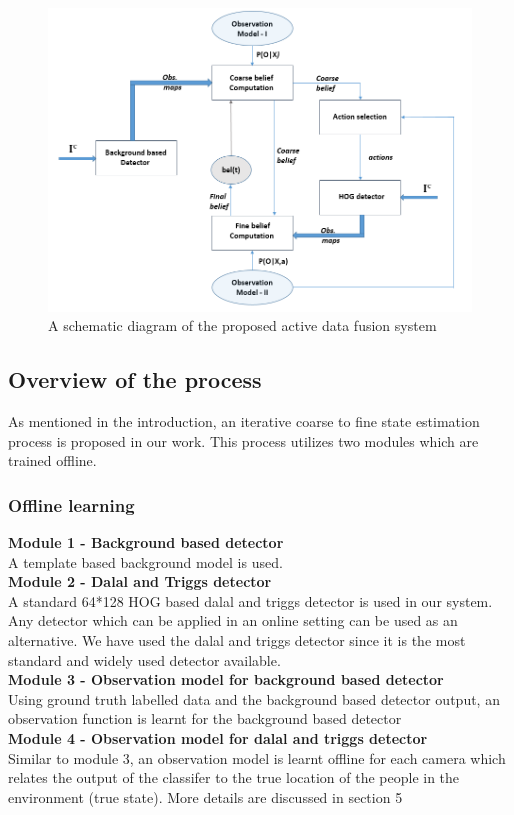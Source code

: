 \documentclass[10pt,twocolumn,letterpaper]{article}
\begin{document}
\begin{figure}
\begin{center}
\includegraphics[width=12cm]{img/block_dia_cir.PNG}
\end{center}
   \caption{A schematic diagram of the proposed active data fusion system}
\label{fig:Block dia}
\end{figure}

\subsection{Overview of the process}
As mentioned in the introduction, an iterative coarse to fine state estimation process is proposed in our work. This process utilizes two modules which are trained offline. 

\subsubsection{Offline learning}
\textbf{Module 1 - Background based detector}\\
A template based background model is used.\\
\textbf{Module 2 - Dalal and Triggs detector}\\
A standard 64*128 HOG based dalal and triggs detector is used in our system. Any detector which can be applied in an online setting can be used as an alternative. We have used the dalal and triggs detector since it is the most standard and widely used detector available.\\ 
\textbf{Module 3 - Observation model for background based detector}\\
Using ground truth labelled data and the background based detector output, an observation function is learnt for the background based detector\\
\textbf{Module 4 - Observation model for dalal and triggs detector}\\ 
Similar to module 3, an observation model is learnt offline for each camera which relates the output of the classifer to the true location of the people in the environment (true state). More details are discussed in section 5\\
\end{document}
